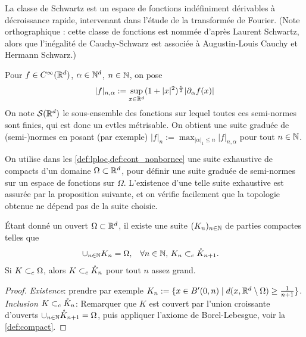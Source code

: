 La classe de Schwartz est un espace de fonctions indéfiniment dérivables à décroissance rapide, intervenant dans l'étude de la transformée de Fourier. 
(Note orthographique : cette classe de fonctions est nommée d'après Laurent Schwartz, alors que l'inégalité de Cauchy-Schwarz est associée à Augustin-Louis Cauchy et Hermann Schwarz.)

\begin{definition}
\label{def:classeSchwartz}
%
	Pour $f \in C^\infty(\mathbb{R}^d)$, $\alpha \in \mathbb{N}^d$, $n \in \mathbb{N}$, on pose 
	\begin{equation}
		|f|_{n,\alpha} := \sup_{x \in \mathbb{R}^d} (1+|x|^2)^\frac n 2 |\partial_\alpha f(x)|
	\end{equation}
	On note $\mathcal{S}(\mathbb{R}^d)$ le sous-ensemble des fonctions sur lequel toutes ces semi-normes sont finies, qui est donc un evtlcs métrisable. On obtient une suite graduée de (semi-)normes en posant (par exemple) $|f|_n := \max_{|\alpha|_1 \leq n} |f|_{n,\alpha}$ pour tout $n \in \mathbb{N}$.
\end{definition}


On utilise dans les \cref{def:lploc,def:cont_nonbornee} une suite exhaustive de compacts d'un domaine $\Omega \subset \mathbb{R}^d$, pour définir une suite graduée de semi-normes sur un espace de fonctions sur $\Omega$. L'existence d'une telle suite exhaustive est assurée par la proposition suivante, et on vérifie facilement que la topologie obtenue ne dépend pas de la suite choisie.

\begin{proposition}
\label{prop:exhaustComp}
%
Étant donné un ouvert $\Omega\subset \mathbb{R}^d$, il existe une suite $(K_n)_{n \in \mathbb{N}}$ de parties compactes telles que 
\begin{align}
\label{eqdef:exhaustive_compacts}
\cup_{n \in \bN} K_n &= \Omega,&
\forall n \in \bN,\, K_n &\csubset \mathring K_{n+1}. 
\leancheck{eqdef:exhaustive_compacts}%
\end{align}
Si $K \subset_c \Omega$, alors $K \subset_c \mathring K_n$ pour tout $n$ assez grand.
\end{proposition}

\begin{proof}
	\emph{Existence}: prendre par exemple $K_n := \{x \in B'(0,n)\mid d(x,\mathbb{R}^d \setminus \Omega) \geq \frac 1{n+1}\}$. 
	\emph{Inclusion $K \subset_c \mathring K_n$}: Remarquer que $K$ est couvert par l'union croissante d'ouverts $\cup_{n\in \mathbb{N}} \mathring K_{n+1} = \Omega$, puis appliquer l'axiome de Borel-Lebesgue, voir la \cref{def:compact}.
\end{proof}

